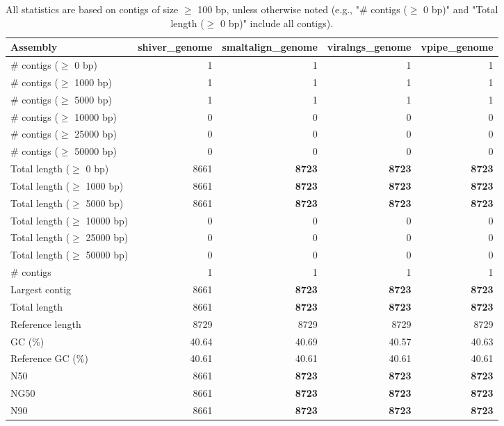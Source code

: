 \documentclass[12pt,a4paper]{article}
\begin{document}
\begin{table}[ht]
\begin{center}
\caption{All statistics are based on contigs of size $\geq$ 100 bp, unless otherwise noted (e.g., "\# contigs ($\geq$ 0 bp)" and "Total length ($\geq$ 0 bp)" include all contigs).}
\begin{tabular}{|l*{4}{|r}|}
\hline
Assembly & shiver\_genome & smaltalign\_genome & viralngs\_genome & vpipe\_genome \\ \hline
\# contigs ($\geq$ 0 bp) & 1 & 1 & 1 & 1 \\ \hline
\# contigs ($\geq$ 1000 bp) & 1 & 1 & 1 & 1 \\ \hline
\# contigs ($\geq$ 5000 bp) & 1 & 1 & 1 & 1 \\ \hline
\# contigs ($\geq$ 10000 bp) & 0 & 0 & 0 & 0 \\ \hline
\# contigs ($\geq$ 25000 bp) & 0 & 0 & 0 & 0 \\ \hline
\# contigs ($\geq$ 50000 bp) & 0 & 0 & 0 & 0 \\ \hline
Total length ($\geq$ 0 bp) & 8661 & {\bf 8723} & {\bf 8723} & {\bf 8723} \\ \hline
Total length ($\geq$ 1000 bp) & 8661 & {\bf 8723} & {\bf 8723} & {\bf 8723} \\ \hline
Total length ($\geq$ 5000 bp) & 8661 & {\bf 8723} & {\bf 8723} & {\bf 8723} \\ \hline
Total length ($\geq$ 10000 bp) & 0 & 0 & 0 & 0 \\ \hline
Total length ($\geq$ 25000 bp) & 0 & 0 & 0 & 0 \\ \hline
Total length ($\geq$ 50000 bp) & 0 & 0 & 0 & 0 \\ \hline
\# contigs & 1 & 1 & 1 & 1 \\ \hline
Largest contig & 8661 & {\bf 8723} & {\bf 8723} & {\bf 8723} \\ \hline
Total length & 8661 & {\bf 8723} & {\bf 8723} & {\bf 8723} \\ \hline
Reference length & 8729 & 8729 & 8729 & 8729 \\ \hline
GC (\%) & 40.64 & 40.69 & 40.57 & 40.63 \\ \hline
Reference GC (\%) & 40.61 & 40.61 & 40.61 & 40.61 \\ \hline
N50 & 8661 & {\bf 8723} & {\bf 8723} & {\bf 8723} \\ \hline
NG50 & 8661 & {\bf 8723} & {\bf 8723} & {\bf 8723} \\ \hline
N90 & 8661 & {\bf 8723} & {\bf 8723} & {\bf 8723} \\ \hline

\end{tabular}
\end{center}
\end{table}
\end{document}
